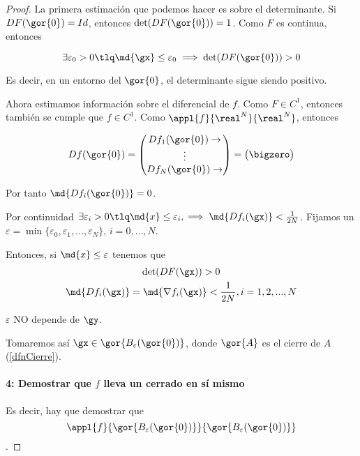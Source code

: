 \begin{proof}
 La primera estimación que podemos hacer es sobre el determinante. Si $DF(\gor{0}) = Id$, entonces $\det(DF(\gor{0})) = 1$. Como $F$ es continua, entonces

 \[ \exists \varepsilon_0 >0 \tlq \md{\gx} \leq \varepsilon_0 \implies  \det(DF(\gor{0}))>0 \]

  Es decir, en un entorno del $\gor{0}$, el determinante sigue siendo positivo.


 Ahora estimamos información sobre el diferencial de $f$. Como $F\in C^1$, entonces también se cumple que $f \in C^1$. Como $\appl{f}{\real^N}{\real^N}$, entonces

  \[ Df(\gor{0}) = \begin{pmatrix}
                  Df_1(\gor{0}) \rightarrow\\
                  \vdots\\
                  Df_N(\gor{0}) \rightarrow
                 \end{pmatrix} = \begin{pmatrix}  \bigzero \end{pmatrix} \]

 Por tanto $\md{Df_i(\gor{0})} = 0$.

 Por continuidad $\exists \varepsilon_i > 0 \tlq \md{x} \leq \varepsilon_i, \implies \md{Df_i(\gx)} <\frac{1}{2N}$. Fijamos un $\varepsilon = \min \{\varepsilon_0,\varepsilon_1,\dotsc, \varepsilon_N\} ,\, i=0,\dotsc,N$.

 Entonces, si $\md{x} \leq \varepsilon$ tenemos  que
\begin{gather}
\det(DF(\gx))>0 \label{eqFinv_DetF} \\
\md{Df_i(\gx)}  = \md{\nabla f_i(\gx)} < \dfrac{1}{2N}, i=1,2,...,N \label{eqFinv_Detfi}
\end{gather}

 \begin{remark} $\varepsilon$ NO depende de $\gy$. \end{remark}


  Tomaremos así $\gx\in \gor{B_\varepsilon(\gor{0})}$, donde $\gor{A}$ es el cierre de $A$ (\ref{dfnCierre}).

  \paragraph{4: Demostrar que $f$ lleva un cerrado en sí mismo}

Es decir, hay que demostrar que \[ \appl{f}{ \gor{B_\varepsilon(\gor{0})}}{ \gor{B_\varepsilon(\gor{0})}} \].


\end{proof}

